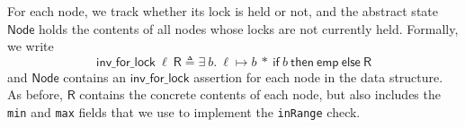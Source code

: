 \documentclass[a4paper,UKenglish,cleveref, autoref, thm-restate]{lipics-v2021}
\newcommand{\treerep}{\ensuremath{\mathsf{Node}}}
\newcommand{\wm}[1]{\textbf{\textcolor{violet}{[William: #1]}}}
\begin{document}
For each node, we track whether its lock is held or not, and the abstract state $\treerep$ holds the contents of all nodes whose locks are not currently held. Formally, we write $$\mathsf{inv\_for\_lock} \ \ell \ \mathsf{R} \triangleq \exists \ b. \ \ell \mapsto b \ \ast \ \mathsf{if}\ b \ \mathsf{then}\ \mathsf{emp}\ \mathsf{else}\ \mathsf{R}$$
and $\treerep$ contains an $\mathsf{inv\_for\_lock}$ assertion for each node in the data structure. As before, $\mathsf{R}$ contains the concrete contents of each node, but also includes the \texttt{min} and \texttt{max} fields that we use to implement the \texttt{inRange} check.
\end{document}
